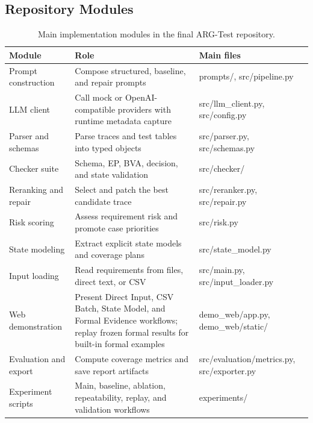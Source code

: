 \documentclass{article}
\renewcommand{\texttt}[1]{{\normalfont #1}}
\begin{document}
\subsection{Repository Modules}
\begin{table}[t]
\centering
\small
\caption{Main implementation modules in the final ARG-Test repository.}
\label{tab:modules}
\begin{tabular}{p{} p{} p{}}
\toprule
\textbf{Module} & \textbf{Role} & \textbf{Main files} \\
\midrule
Prompt construction & Compose structured, baseline, and repair prompts & \texttt{prompts/}, \texttt{src/pipeline.py} \\
LLM client & Call mock or OpenAI-compatible providers with runtime metadata capture & \texttt{src/llm\_client.py}, \texttt{src/config.py} \\
Parser and schemas & Parse traces and test tables into typed objects & \texttt{src/parser.py}, \texttt{src/schemas.py} \\
Checker suite & Schema, EP, BVA, decision, and state validation & \texttt{src/checker/} \\
Reranking and repair & Select and patch the best candidate trace & \texttt{src/reranker.py}, \texttt{src/repair.py} \\
Risk scoring & Assess requirement risk and promote case priorities & \texttt{src/risk.py} \\
State modeling & Extract explicit state models and coverage plans & \texttt{src/state\_model.py} \\
Input loading & Read requirements from files, direct text, or CSV & \texttt{src/main.py}, \texttt{src/input\_loader.py} \\
Web demonstration & Present Direct Input, CSV Batch, State Model, and Formal Evidence workflows; replay frozen formal results for built-in formal examples & \texttt{demo\_web/app.py}, \texttt{demo\_web/static/} \\
Evaluation and export & Compute coverage metrics and save report artifacts & \texttt{src/evaluation/metrics.py}, \texttt{src/exporter.py} \\
Experiment scripts & Main, baseline, ablation, repeatability, replay, and validation workflows & \texttt{experiments/} \\
\bottomrule
\end{tabular}
\end{table}
\end{document}
